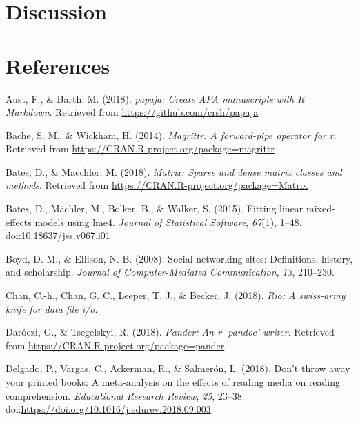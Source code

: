 \documentclass[man, fleqn, noextraspace]{apa6}
\theoremstyle{definition}
\theoremstyle{definition}
\theoremstyle{definition}
\theoremstyle{remark}
\begin{document}
\section{Discussion}\label{discussion}

\newpage

\section{References}\label{references}

\begingroup
\setlength{\parindent}{-0.5in} \setlength{\leftskip}{0.5in}

\hypertarget{refs}{}
\hypertarget{ref-R-papaja}{}
Aust, F., \& Barth, M. (2018). \emph{papaja: Create APA manuscripts with
R Markdown}. Retrieved from \url{https://github.com/crsh/papaja}

\hypertarget{ref-R-magrittr}{}
Bache, S. M., \& Wickham, H. (2014). \emph{Magrittr: A forward-pipe
operator for r}. Retrieved from
\url{https://CRAN.R-project.org/package=magrittr}

\hypertarget{ref-R-Matrix}{}
Bates, D., \& Maechler, M. (2018). \emph{Matrix: Sparse and dense matrix
classes and methods}. Retrieved from
\url{https://CRAN.R-project.org/package=Matrix}

\hypertarget{ref-R-lme4}{}
Bates, D., Mächler, M., Bolker, B., \& Walker, S. (2015). Fitting linear
mixed-effects models using lme4. \emph{Journal of Statistical Software},
\emph{67}(1), 1--48.
doi:\href{https://doi.org/10.18637/jss.v067.i01}{10.18637/jss.v067.i01}

\hypertarget{ref-Boyd2008}{}
Boyd, D. M., \& Ellison, N. B. (2008). Social networking sites:
Definitions, history, and scholarship. \emph{Journal of
Computer-Mediated Communication}, \emph{13}, 210--230.

\hypertarget{ref-R-rio}{}
Chan, C.-h., Chan, G. C., Leeper, T. J., \& Becker, J. (2018).
\emph{Rio: A swiss-army knife for data file i/o}.

\hypertarget{ref-R-pander}{}
Daróczi, G., \& Tsegelskyi, R. (2018). \emph{Pander: An r 'pandoc'
writer}. Retrieved from \url{https://CRAN.R-project.org/package=pander}

\hypertarget{ref-Delgado2018}{}
Delgado, P., Vargas, C., Ackerman, R., \& Salmerón, L. (2018). Don't
throw away your printed books: A meta-analysis on the effects of reading
media on reading comprehension. \emph{Educational Research Review},
\emph{25}, 23--38.
doi:\href{https://doi.org/https://doi.org/10.1016/j.edurev.2018.09.003}{https://doi.org/10.1016/j.edurev.2018.09.003}
\end{document}
